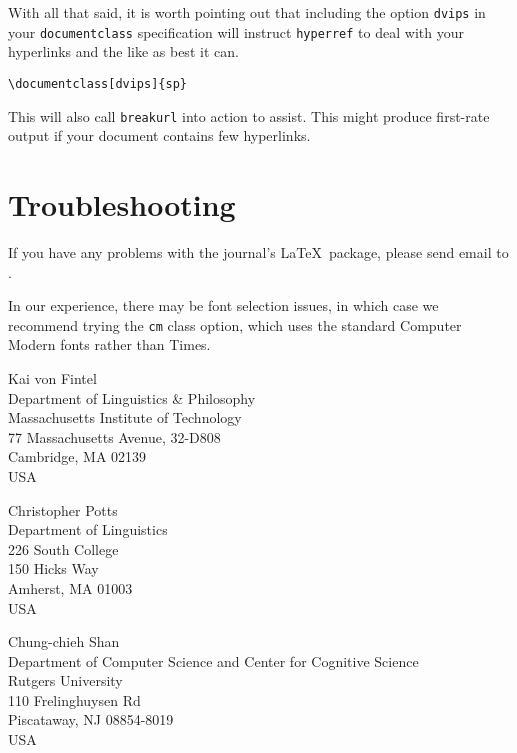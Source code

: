 \documentclass[lucida,final]{sp}
\newcommand{\spfile}[1]{\texttt{#1}}
\newcommand{\spcode}[1]{\texttt{#1}}
\begin{document}
With all that said, it is worth pointing out that including the option
\spcode{dvips} in your \spcode{documentclass} specification will
instruct \spfile{hyperref} to deal with your hyperlinks and the like
as best it can.
%
\begin{Verbatim}
\documentclass[dvips]{sp}
\end{Verbatim}
%
This will also call \spfile{breakurl} into action to assist.  This
might produce first-rate output if your document contains few
hyperlinks.


\section{Troubleshooting}

If you have any problems with the journal's \LaTeX\ package, please
send email to .

In our experience, there may be font selection issues, in which case
we recommend trying the \spcode{cm} class option, which uses the
standard Computer Modern fonts rather than Times.





\begin{addresses}
  \begin{address}
    Kai von Fintel\\
    Department of Linguistics \& Philosophy\\
    Massachusetts Institute of Technology\\
    77 Massachusetts Avenue, 32-D808\\
    Cambridge, MA 02139\\
    USA\\
  \end{address}
  \begin{address}
    Christopher Potts\\
    Department of Linguistics\\
    226 South College\\
    150 Hicks Way\\
    Amherst, MA 01003\\
    USA\\
  \end{address}
  \begin{address}
    Chung-chieh Shan\\
    Department of Computer Science and Center for Cognitive Science\\
    Rutgers University\\
    110 Frelinghuysen Rd\\
    Piscataway, NJ 08854-8019\\
    USA\\
  \end{address}
\end{addresses}

\end{document}

